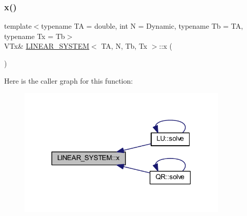 \mbox{\label{class_l_i_n_e_a_r___s_y_s_t_e_m_a0585adb67fae39d29e887d03d071fc74}} 
\subsubsection{\texorpdfstring{x()}{x()}\hspace{0.1cm}{\footnotesize\ttfamily [1/2]}}
{\footnotesize\ttfamily template$<$typename TA = double, int N = Dynamic, typename Tb = TA, typename Tx = Tb$>$ \\
V\+Tx\& \mbox{\hyperlink{class_l_i_n_e_a_r___s_y_s_t_e_m}{L\+I\+N\+E\+A\+R\+\_\+\+S\+Y\+S\+T\+EM}}$<$ TA, N, Tb, Tx $>$\+::x (\begin{DoxyParamCaption}{ }\end{DoxyParamCaption})\hspace{0.3cm}{\ttfamily [inline]}}

Here is the caller graph for this function\+:
\nopagebreak
\begin{figure}[H]
\begin{center}
\leavevmode
\includegraphics[width=283pt]{class_l_i_n_e_a_r___s_y_s_t_e_m_a0585adb67fae39d29e887d03d071fc74_icgraph}
\end{center}
\end{figure}
\mbox{\label{class_l_i_n_e_a_r___s_y_s_t_e_m_ad00a0cae1d479dd527cc374c210b9429}} 
